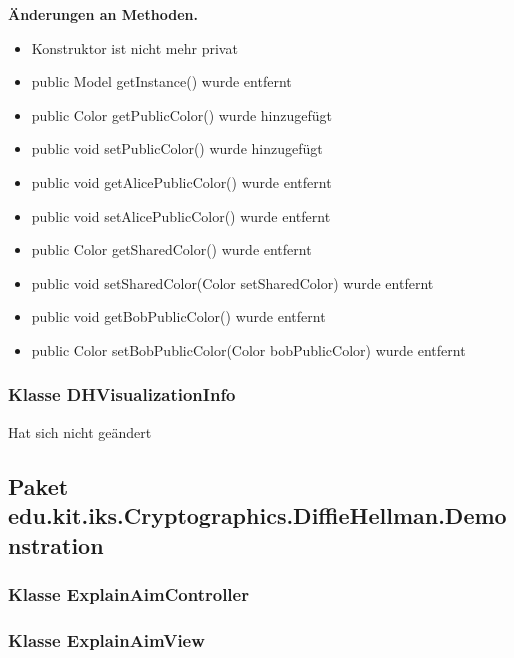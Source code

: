 \documentclass{article}
\begin{document}
    \textbf{Änderungen an Methoden.}\newline
	   \begin{itemize}
           \item Konstruktor ist nicht mehr privat\newline
           \item public Model getInstance() wurde entfernt\newline
           \item public Color getPublicColor() wurde hinzugefügt\newline
           \item public void setPublicColor() wurde hinzugefügt\newline
           \item public void getAlicePublicColor() wurde entfernt\newline
           \item public void setAlicePublicColor() wurde entfernt\newline
           \item public Color getSharedColor() wurde entfernt\newline
           \item public void setSharedColor(Color setSharedColor) wurde entfernt\newline
           \item public void getBobPublicColor() wurde entfernt\newline
           \item public Color setBobPublicColor(Color bobPublicColor) wurde entfernt\newline
           \end{itemize}

	\subsubsection{Klasse DHVisualizationInfo}
    Hat sich nicht geändert

  \subsection{Paket edu.kit.iks.Cryptographics.DiffieHellman.Demonstration}

	\subsubsection{Klasse ExplainAimController}

	\subsubsection{Klasse ExplainAimView}
\end{document}

